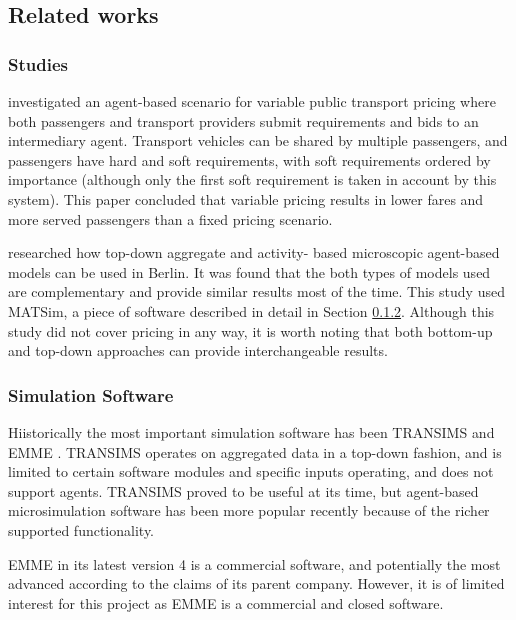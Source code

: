 \subsection{Related works}
\label{sec:literature:related}

\subsubsection{Studies}

\textcite{Emele2013pricing+rural} investigated an agent-based scenario for
variable public transport pricing where both passengers and transport providers
submit requirements and bids to an intermediary agent. Transport vehicles can
be shared by multiple passengers, and passengers have hard and soft
requirements, with soft requirements ordered by importance (although only the
first soft requirement is taken in account by this system). This paper
concluded that variable pricing results in lower fares and more served
passengers than a fixed pricing scenario.

\textcite{Neumann2011berlin} researched how top-down aggregate and activity-
based microscopic agent-based models can be used in Berlin. It was found that
the both types of models used are complementary and provide similar results
most of the time. This study used MATSim, a piece of software described in
detail in Section \ref{sec:literature:related:simulation}. Although this study
did not cover pricing in any way, it is worth noting that both bottom-up and
top-down approaches can provide interchangeable results.

\subsubsection{Simulation Software}
\label{sec:literature:related:simulation}

Hiistorically the most important simulation software has been TRANSIMS
\parencite{Smith1995taxi+transims} and EMME \parencite{Gao2010taxi+comparison}.
TRANSIMS operates on aggregated data in a top-down fashion, and is limited to
certain software modules and specific inputs operating, and does not support
agents. TRANSIMS proved to be useful at its time, but agent-based
microsimulation software has been more popular recently because of the richer
supported functionality. \parencite{Bernhardt2007taxi+agent}

EMME in its latest version 4 is a commercial software, and potentially the most
advanced according to the claims of its parent company. However, it is of
limited interest for this project as EMME is a commercial and closed software.
\parencite{Inro2014emme}

